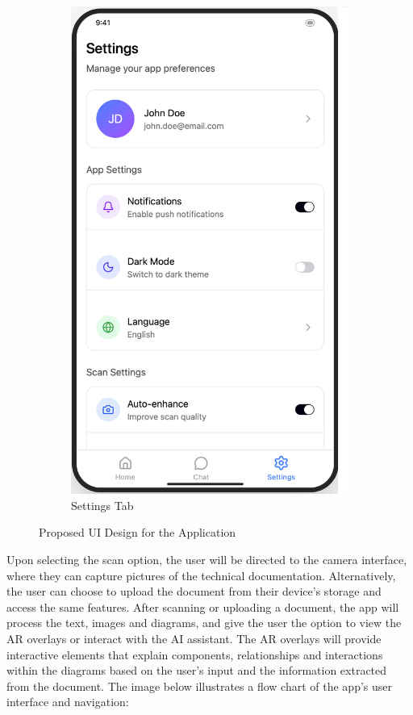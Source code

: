 \documentclass[10pt]{article}
\begin{document}
\begin{figure}
\begin{subfigure}{0.3\textwidth}
                \includegraphics[width=\textwidth]{img/FrontendSettingsTab.png}
                \caption{Settings Tab}
                \label{fig:SettingsTab}
            \end{subfigure}
            \caption{Proposed UI Design for the Application}
            \label{fig:UIDesign}
        \end{figure}

    Upon selecting the scan option, the user will be directed to the camera interface, where they can capture pictures of the technical documentation. Alternatively, the user can choose to upload the document from their device's storage and access the same features. After scanning or uploading
        a document, the app will process the text, images and diagrams, and give the user the option to view the AR overlays or interact with the AI assistant. The AR overlays will provide interactive elements that explain components, relationships and interactions within the diagrams based on the user's
        input and the information extracted from the document. The image below illustrates a flow chart of the app's user interface and navigation:
\end{document}
